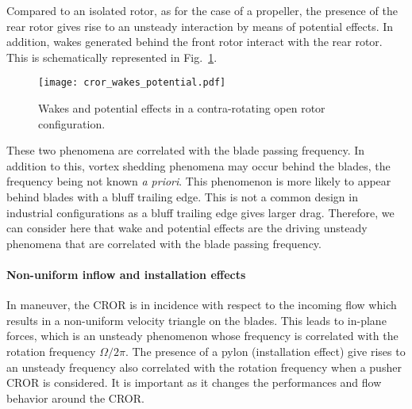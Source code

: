 Compared to an isolated rotor, as for the case of a propeller,
the presence of the rear rotor gives rise to an unsteady
interaction by means of potential effects. In addition, wakes generated
behind the front rotor interact with the rear rotor.
This is schematically represented in Fig.~\ref{fig:cror_wakes_potential}.
\begin{figure}[htp]
  \centering
  \texttt{[image: cror\_wakes\_potential.pdf]}
  \caption{Wakes and potential effects in a 
  contra-rotating open rotor configuration.}
  \label{fig:cror_wakes_potential}
\end{figure}
These two phenomena are correlated with the blade passing frequency.
In addition to this, vortex shedding phenomena may occur behind the blades, 
the frequency being not known \emph{a priori}.
This phenomenon is more likely to appear behind blades with a bluff trailing edge.
This is not a common design in industrial configurations as a bluff trailing edge
gives larger drag. Therefore, we can consider here that 
wake and potential effects are the driving unsteady phenomena
that are correlated with the blade passing frequency.

\paragraph{Non-uniform inflow and installation effects}

In maneuver, the CROR is in incidence with respect to the incoming flow
which results in a non-uniform velocity triangle on the blades.
This leads to in-plane forces, which is an unsteady phenomenon
whose frequency is correlated with the rotation frequency $\Omega / 2 \pi$.
The presence of a pylon (installation effect) give rises to an unsteady frequency
also correlated with the rotation frequency when a pusher CROR is considered.
It is important as it changes the performances and flow behavior around the CROR.
